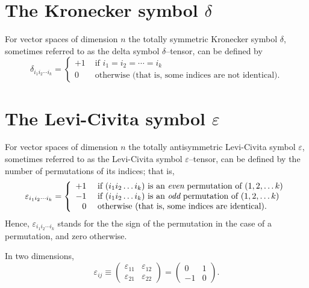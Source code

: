 \section{The Kronecker symbol $\delta$}
For vector spaces of dimension $n$ the totally symmetric Kronecker symbol $\delta$,
sometimes referred to
as the delta symbol $\delta$--tensor, can be defined by
\begin{equation}
\delta_{i_1 i_2\cdots i_k}
=
\left\{
\begin{array}{rl}
+1&\textrm{ if }  i_1 = i_2 = \cdots = i_k \\
0&\textrm{ otherwise (that is, some indices are not identical).}
\end{array}
\right.
\end{equation}

\section{The Levi-Civita symbol $\varepsilon$}
For vector spaces of dimension $n$ the totally antisymmetric Levi-Civita symbol $\varepsilon$, sometimes referred to
as the Levi-Civita symbol $\varepsilon$--tensor, can be defined by the number of permutations of its indices; that is,
\begin{equation}
\varepsilon_{i_1 i_2\cdots i_k}
=
\left\{
\begin{array}{rl}
+1&\textrm{ if } (i_1 i_2\ldots i_k) \textrm{ is an {\em even} permutation of } (1,2,\ldots k)\\
-1&\textrm{ if } (i_1 i_2\ldots i_k) \textrm{ is an {\em odd} permutation of } (1,2,\ldots k)\\
0&\textrm{ otherwise (that is, some indices are identical).}
\end{array}
\right.
\end{equation}
Hence, $\varepsilon_{i_1 i_2\cdots i_k}$ stands for the  the sign of the permutation in the case of a permutation, and zero otherwise.

{
\color{blue}
\bexample

In two dimensions,
$$\varepsilon_{ij}\equiv
\left(
\begin{array}{rrrr}
\varepsilon_{11}&\varepsilon_{12}\\
\varepsilon_{21}&\varepsilon_{22}
\end{array}
\right)
=
\left(
\begin{array}{rrrr}
0&1\\
-1&0
\end{array}
\right)
.
$$
\eexample
}

